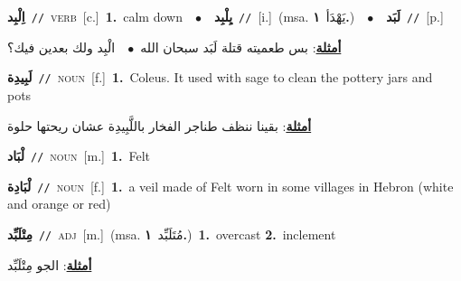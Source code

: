 \documentclass[10pt,a4paper,twoside]{article} %
\begin{document}
\begin{multicols}{2}
{{{{{{\setlength\topsep{0pt}\textbf{\foreignlanguage{arabic}{اِلْبِد}}\ {\color{gray}\texttt{//}\color{black}}\ \textsc{verb}\ [c.]\ \textbf{1.}~calm down\ \ $\bullet$\ \ \setlength\topsep{0pt}\textbf{\foreignlanguage{arabic}{يِلْبِد}}\ {\color{gray}\texttt{//}\color{black}}\ [i.]\ \color{gray}(msa. \foreignlanguage{arabic}{يَهْدَأ}~\foreignlanguage{arabic}{\textbf{١.}})\color{black}\ \ $\bullet$\ \ \setlength\topsep{0pt}\textbf{\foreignlanguage{arabic}{لَبَد}}\ {\color{gray}\texttt{//}\color{black}}\ [p.]\  \begin{flushright}\color{gray}\foreignlanguage{arabic}{\textbf{\underline{\foreignlanguage{arabic}{أمثلة}}}: بس طعميته قتلة لَبَد سبحان الله\ $\bullet$\ \  الْبِد ولك بعدين فيك؟}\end{flushright}\color{black}} \vspace{2mm}

{\setlength\topsep{0pt}\textbf{\foreignlanguage{arabic}{لَبِيدِة}}\ {\color{gray}\texttt{//}\color{black}}\ \textsc{noun}\ [f.]\ \textbf{1.}~Coleus. It used with sage to clean the pottery jars and pots\  \begin{flushright}\color{gray}\foreignlanguage{arabic}{\textbf{\underline{\foreignlanguage{arabic}{أمثلة}}}: بقينا ننظف طناجر الفخار باللَّبِيدِة عشان ريحتها حلوة}\end{flushright}\color{black}} \vspace{2mm}

{\setlength\topsep{0pt}\textbf{\foreignlanguage{arabic}{لْبَاد}}\ {\color{gray}\texttt{//}\color{black}}\ \textsc{noun}\ [m.]\ \textbf{1.}~Felt\ 

{\setlength\topsep{0pt}\textbf{\foreignlanguage{arabic}{لْبَادِة}}\ {\color{gray}\texttt{//}\color{black}}\ \textsc{noun}\ [f.]\ \textbf{1.}~a veil made of Felt worn in some villages in Hebron (white and orange or red)\ 

{\setlength\topsep{0pt}\textbf{\foreignlanguage{arabic}{مِتْلَبِّد}}\ {\color{gray}\texttt{//}\color{black}}\ \textsc{adj}\ [m.]\ \color{gray}(msa. \foreignlanguage{arabic}{مُتَلَبِّد}~\foreignlanguage{arabic}{\textbf{١.}})\color{black}\ \textbf{1.}~overcast  \textbf{2.}~inclement\  \begin{flushright}\color{gray}\foreignlanguage{arabic}{\textbf{\underline{\foreignlanguage{arabic}{أمثلة}}}: الجو مِتْلَبِّد}\end{flushright}\color{black}} \vspace{2mm}

}}}}}}}
\end{multicols}
\end{document}

